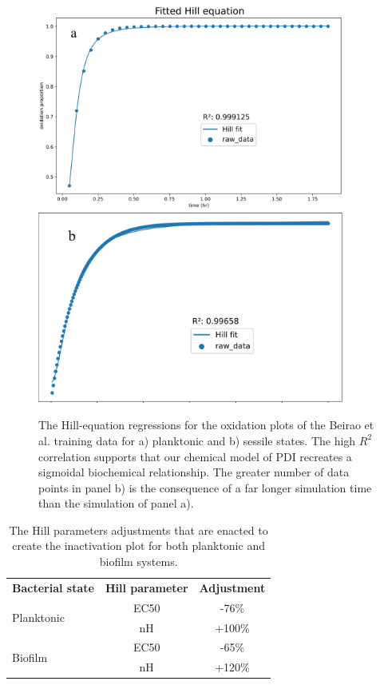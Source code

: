 \begin{figure}
    \centering
    \includegraphics[width = 0.9\textwidth]{images/PDIpy/training/10uM_regression.png}
    \vspace{5mm}
    \midrule
    \vspace{5mm}
    \includegraphics[width = 0.9\textwidth]{images/PDIpy/training/10uM_biofilm_regression.png}
    \caption{
        The Hill-equation regressions for the oxidation plots of the Beirao et al. training data for a) planktonic and b) sessile states. The high $R^2$ correlation supports that our chemical model of PDI recreates a sigmoidal biochemical relationship. The greater number of data points in panel b) is the consequence of a far longer simulation time than the simulation of panel a).
    }
    \label{hill_regression}
\end{figure}

\begin{table}
    \centering
    \begin{tabular}{l|c|c}
        \textbf{Bacterial state} & \textbf{Hill parameter} & \textbf{Adjustment} \\
        \multirow{2}{0}{Planktonic} & EC50 & -76\% \\
         & nH & +100\% \\
         \midrule
         \multirow{2}{0}{Biofilm} & EC50 & -65\% \\
         & nH & +120\% \\
    \end{tabular}
    \caption{
        The Hill parameters adjustments that are enacted to create the inactivation plot for both planktonic and biofilm systems. 
    }
    \label{hill_parameters}
\end{table}


